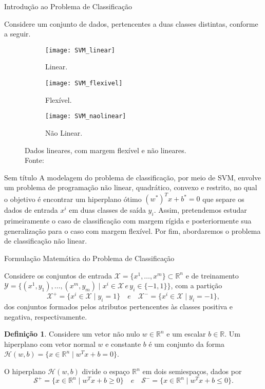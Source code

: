 \documentclass{beamer}
\def\Xset{\mathcal{X}}
\def\Yset{\mathcal{Y}}
\def\Hset{\mathcal{H}}
\def\RR{\mathds{R}}
\theoremstyle{definition}%
\newtheorem{defi}{Definição}
\begin{document}
\begin{frame}{Introdução ao Problema de Classificação}

Considere um conjunto de dados, pertencentes a duas classes distintas, conforme  a seguir.

\begin{figure}[!h] 
	\centering
	\begin{subfigure}[h]{0.3\textwidth}
		\centering
		\texttt{[image: SVM\_linear]}
		\caption{Linear. \label{fig1:a}}
	\end{subfigure}
	\begin{subfigure}[!h]{0.3\textwidth}
		\centering
		\texttt{[image: SVM\_flexivel]}
		\caption{Flexível. \label{fig1:b}}
	\end{subfigure}
	\begin{subfigure}[!h]{0.3\textwidth}
		\centering
		\texttt{[image: SVM\_naolinear]}
		\caption{Não Linear. \label{fig1:c}}
	\end{subfigure}
	\caption{Dados lineares, com margem flexível e não lineares. \label{fig1}\\ Fonte: \textcite{Evelin2017}}
\end{figure}
\end{frame}


\begin{frame}{Sem título}
A modelagem do problema de classificação, por meio de SVM, envolve um problema de programação não linear, quadrático, convexo e restrito, no qual o objetivo é encontrar um hiperplano ótimo $(w^{*})^{T}x+b^{*}=0$ que separe os dados de entrada $x^{i}$ em duas classes de saída $y_{i}$. Assim, pretendemos estudar primeiramente o caso de classificação com margem rígida e posteriormente sua generalização para o caso com margem flexível. Por fim, abordaremos o problema de classificação não linear. 
\end{frame}

\begin{frame}{Formulação Matemática do Problema de Classificação}

Considere os conjuntos de entrada $\Xset =\{x^1, \ldots , x^m \} \subset \RR^n$ e de treinamento $\Yset=\{(x^1, y_1), \ldots , (x^m, y_m)\mid x^i \in \Xset \, e \, y_i \in \{-1,1\}\}$, com a partição 
\[ \label{conj1}
\Xset ^{+} =\{x^i \in \Xset\mid y_i=1\} \quad e \quad \Xset^{-}=\{x^i \in \Xset\mid y_i=-1\},
\]
dos conjuntos formados pelos atributos pertencentes às classes positiva e negativa, respectivamente.

\begin{defi} Considere um vetor não nulo $w\in \RR^n$ e um escalar $b\in \RR$. Um hiperplano com vetor normal $w$ e constante $b$ é um conjunto da forma $\Hset(w,b)=\{x\in \RR^n \mid w^{T}x+b=0\}$.
\end{defi}

O hiperplano $\Hset(w,b)$ divide o espaço $\RR^n$ em dois semiespaços, dados por
\[ \label{conj2}
\mathcal{S}^{+}=\{x\in \RR^n \mid w^{T}x+b\geq 0\} \quad e \quad \mathcal{S}^{-}=\{x\in \RR^n \mid w^{T}x+b\leq 0\}.
\]

\end{frame}
\end{document}
